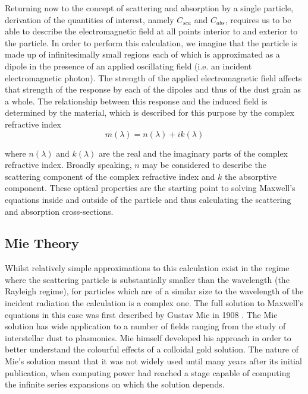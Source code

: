 Returning now to the concept of scattering and absorption by a single particle, derivation of the quantities of interest, namely $C_{sca}$ and $C_{abs}$, requires us to be able to describe the electromagnetic field at all points interior to and exterior to the particle.  In order to perform this calculation, we imagine that the particle is made up of infinitesimally small regions each of which is approximated as a dipole in the presence of an applied oscillating field (i.e. an incident electromagnetic photon).  The strength of the applied electromagnetic field affects that strength of the response by each of the dipoles and thus of the dust grain as a whole.  The relationship between this response and the induced field is determined by the material, which is described for this purpose by the complex refractive index 
\begin{equation}
m(\lambda)=n(\lambda)+ik(\lambda)
\end{equation}

\noindent where $n(\lambda)$ and $k(\lambda)$ are the real and the imaginary parts of the complex refractive index.  Broadly speaking, $n$ may be considered to describe the scattering component of the complex refractive index and $k$ the absorptive component.  These optical properties are the starting point to solving Maxwell's equations inside and outside of the particle and thus calculating the scattering and absorption cross-sections.

\subsection{Mie Theory}
\label{scn:mie_theory}

Whilst relatively simple approximations to this calculation exist in the regime where the scattering particle is substantially smaller than the wavelength (the Rayleigh regime), for particles which are of a similar size to the wavelength of the incident radiation the calculation is a complex one.  The full solution to Maxwell's equations in this case was first described by Gustav Mie in 1908 \citep{Mie1908}.  The Mie solution has wide application to a number of fields ranging from the study of interstellar dust to plasmonics.  Mie himself developed his approach in order to better understand the colourful effects of a colloidal gold solution.  The nature of Mie's solution meant that it was not widely used until many years after its initial publication, when computing power had reached a stage capable of computing the infinite series expansions on which the solution depends.

